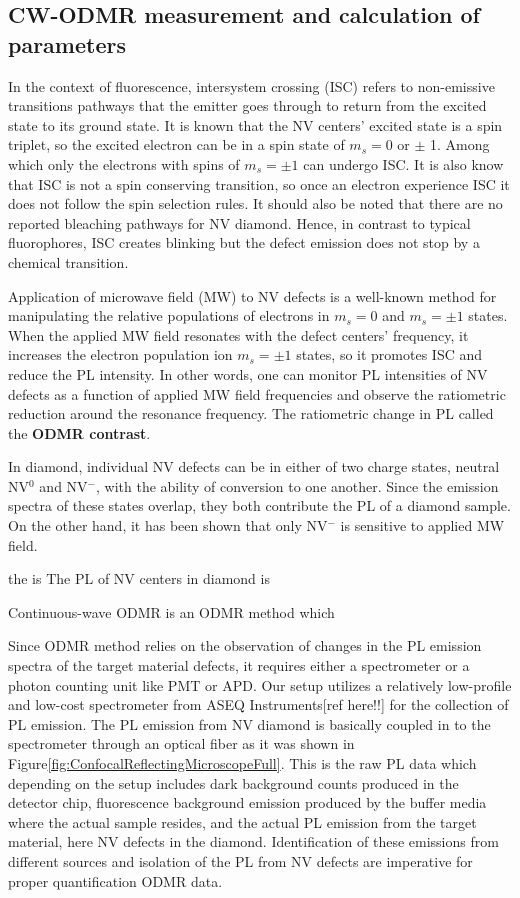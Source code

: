 \subsection{CW-ODMR measurement and calculation of parameters}
In the context of fluorescence, intersystem crossing (ISC) refers to 
non-emissive transitions pathways that the emitter goes through to return from the 
excited state to its ground state. It is known that the NV centers' excited state 
is a spin triplet, so the excited electron can be in a spin state of $m_{s} = 0$ 
or $\pm$ 1. Among which only the electrons with spins of $m_{s} = \pm 1$ can
undergo ISC. It is also know that ISC is not a spin conserving transition, so 
once an electron experience ISC it does not follow the spin selection rules.
It should also be noted that there are no reported bleaching pathways for NV diamond.
Hence, in contrast to typical fluorophores, ISC creates blinking but the defect 
emission does not stop by a chemical transition. 

Application of microwave field (MW) to NV defects is a well-known method for manipulating
the relative populations of electrons in $m_{s} = 0$ and $m_{s} = \pm 1$ states. When 
the applied MW field resonates with the defect centers' frequency, it increases the 
electron population ion $m_{s} = \pm 1$ states, so it promotes ISC and reduce the 
PL intensity. In other words, one can monitor PL intensities of NV defects as a 
function of applied MW field frequencies and observe the ratiometric reduction around 
the resonance frequency. The ratiometric change in PL called the \textbf{ODMR contrast}. 

In diamond, individual NV defects can be in either of two charge states, neutral 
NV$^{0}$ and NV$^{-}$, with the ability of conversion to one another. Since the 
emission spectra of these states overlap, they both contribute the PL of a diamond 
sample. On the other hand, it has been shown that only NV$^{-}$ is sensitive to
applied MW field.


the is The PL of NV centers in diamond is 

Continuous-wave ODMR is an ODMR method which 


Since ODMR method relies on the observation of changes in the PL emission 
spectra of the target material defects, it requires either a spectrometer 
or a photon counting unit like PMT or APD. Our setup utilizes a relatively 
low-profile and low-cost spectrometer from ASEQ Instruments[ref here!!] for
the collection of PL emission. The PL emission from NV diamond is basically  
coupled in to the spectrometer through an optical fiber as it was shown in 
Figure\ref{fig:ConfocalReflectingMicroscopeFull}. This is the raw PL data 
which depending on the setup includes dark background counts produced in the
detector chip, fluorescence background emission produced by the buffer media
where the actual sample resides, and the actual PL emission from the target
material, here NV defects in the diamond. Identification of these emissions 
from different sources and isolation of the PL from NV defects are imperative
for proper quantification ODMR data.

